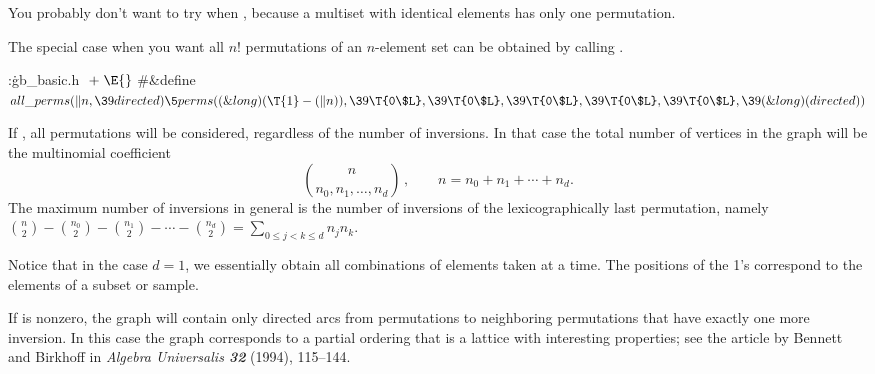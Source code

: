 You probably don't want to try 
when , because a multiset with  identical
elements has only
one permutation.

The special case when you want all $n!$ permutations of an $n$-element set
can be obtained by calling .

\Y\B\4:\.{gb\_basic.h }\X${}\mathrel+\E{}$\6
\8\#\&{define} ${}\\{all\_perms}(\|n,\39\\{directed})\5\\{perms}((\&{long})(%
\T{1}-(\|n)),\39\T{0\$L},\39\T{0\$L},\39\T{0\$L},\39\T{0\$L},\39\T{0\$L},\39(%
\&{long})(\\{directed})){}$\par
\fi

If , all permutations will be considered,
regardless of
the number of inversions. In that case the total number of vertices in
the graph will be the multinomial coefficient $${n\choose
n_0,n_1,\ldots,n_d}\,,\qquad n=n_0+n_1+\cdots+n_d.$$ The maximum
number of inversions in general is the number of inversions of the
lexicographically last permutation, namely ${n\choose2}-{n_0\choose2}-
{n_1\choose2}-\cdots-{n_d\choose2}=\sum_{0\le j<k\le d}n_jn_k$.

\vskip1pt
Notice that in the case $d=1$, we essentially obtain all combinations of
 elements taken  at a time. The positions of the
1's correspond
to the elements of a subset or sample.

If  is nonzero, the graph will contain only directed arcs
from permutations to neighboring permutations that have exactly one more
inversion. In this case the graph corresponds to a partial ordering that is a
lattice with interesting properties; see the article by Bennett and Birkhoff
in {\sl Algebra Universalis\/ \bf32} (1994), 115--144.

